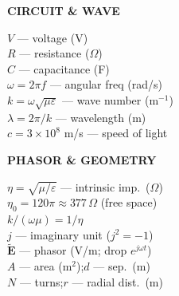 \documentclass[6pt,letterpaper]{article}
\newcommand{\shead}[3]{%
  \noindent\colorbox{#1}{\parbox{\dimexpr\linewidth-2\fboxsep\relax}%
  {\color{#2}\bfseries\fontsize{6}{7}\selectfont #3}}\vspace{0.5pt}}
\begin{document}
\begin{minipage}[t]{0.19\linewidth}
\shead{bluebg}{blue}{CIRCUIT \& WAVE}
\begin{ebox}
$V$ — voltage (V)\\
$R$ — resistance ($\Omega$)\\
$C$ — capacitance (F)\\
$\omega=2\pi f$ — angular freq (rad/s)\\
$k=\omega\sqrt{\mu\varepsilon}$ — wave number (m$^{-1}$)\\
$\lambda=2\pi/k$ — wavelength (m)\\
$c=3\!\times\!10^8$ m/s — speed of light
\end{ebox}
\end{minipage}\hfill
\begin{minipage}[t]{0.19\linewidth}
\shead{pinkbg}{pink}{PHASOR \& GEOMETRY}
\begin{ebox}
$\eta=\sqrt{\mu/\varepsilon}$ — intrinsic imp.\ ($\Omega$)\\
$\eta_0=120\pi\approx377\,\Omega$ (free space)\\
$k/(\omega\mu)=1/\eta$\\
$j$ — imaginary unit ($j^2=-1$)\\
$\tilde{\mathbf{E}}$ — phasor (V/m; drop $e^{j\omega t}$)\\[2pt]
$A$ — area (m$^2$);\quad $d$ — sep.\ (m)\\
$N$ — turns;\quad $r$ — radial dist.\ (m)
\end{ebox}
\end{minipage}

\newpage
\end{document}
